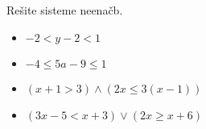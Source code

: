         
        
        
                
                    \begin{naloga}
                        Rešite sisteme neenačb.
                        \begin{itemize}
                                \item $-2<y-2<1$ 
                                \item $-4\leq 5a-9\leq 1$ 
                                \item $(x+1>3)\land (2x\leq 3(x-1))$ 
                                \item $(3x-5<x+3)\lor (2x\geq x+6)$ 
                        \end{itemize}
                    \end{naloga}
                
        


